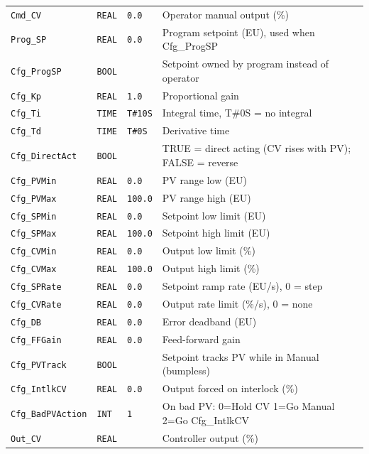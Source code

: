 {\begin{longtable}{@{}>{\raggedright\arraybackslash}p{3.4cm}>{\raggedright\arraybackslash}p{3.3cm}>{\raggedright\arraybackslash}p{1.3cm}>{\raggedright\arraybackslash}p{6.4cm}@{}}
\texttt{Cmd\_CV} & \texttt{REAL} & \texttt{0.0} & Operator manual output (\%) \\
\texttt{Prog\_SP} & \texttt{REAL} & \texttt{0.0} & Program setpoint (EU), used when Cfg\_ProgSP \\
\texttt{Cfg\_ProgSP} & \texttt{BOOL} &  & Setpoint owned by program instead of operator \\
\texttt{Cfg\_Kp} & \texttt{REAL} & \texttt{1.0} & Proportional gain \\
\texttt{Cfg\_Ti} & \texttt{TIME} & \texttt{T\#10S} & Integral time, T\#0S = no integral \\
\texttt{Cfg\_Td} & \texttt{TIME} & \texttt{T\#0S} & Derivative time \\
\texttt{Cfg\_DirectAct} & \texttt{BOOL} &  & TRUE = direct acting (CV rises with PV); FALSE = reverse \\
\texttt{Cfg\_PVMin} & \texttt{REAL} & \texttt{0.0} & PV range low (EU) \\
\texttt{Cfg\_PVMax} & \texttt{REAL} & \texttt{100.0} & PV range high (EU) \\
\texttt{Cfg\_SPMin} & \texttt{REAL} & \texttt{0.0} & Setpoint low limit (EU) \\
\texttt{Cfg\_SPMax} & \texttt{REAL} & \texttt{100.0} & Setpoint high limit (EU) \\
\texttt{Cfg\_CVMin} & \texttt{REAL} & \texttt{0.0} & Output low limit (\%) \\
\texttt{Cfg\_CVMax} & \texttt{REAL} & \texttt{100.0} & Output high limit (\%) \\
\texttt{Cfg\_SPRate} & \texttt{REAL} & \texttt{0.0} & Setpoint ramp rate (EU/\allowbreak{}s), 0 = step \\
\texttt{Cfg\_CVRate} & \texttt{REAL} & \texttt{0.0} & Output rate limit (\%/\allowbreak{}s), 0 = none \\
\texttt{Cfg\_DB} & \texttt{REAL} & \texttt{0.0} & Error deadband (EU) \\
\texttt{Cfg\_FFGain} & \texttt{REAL} & \texttt{0.0} & Feed-forward gain \\
\texttt{Cfg\_PVTrack} & \texttt{BOOL} &  & Setpoint tracks PV while in Manual (bumpless) \\
\texttt{Cfg\_IntlkCV} & \texttt{REAL} & \texttt{0.0} & Output forced on interlock (\%) \\
\texttt{Cfg\_BadPVAction} & \texttt{INT} & \texttt{1} & On bad PV: 0=Hold CV 1=Go Manual 2=Go Cfg\_IntlkCV \\
\texttt{Out\_CV} & \texttt{REAL} &  & Controller output (\%) \\

\end{longtable}}
